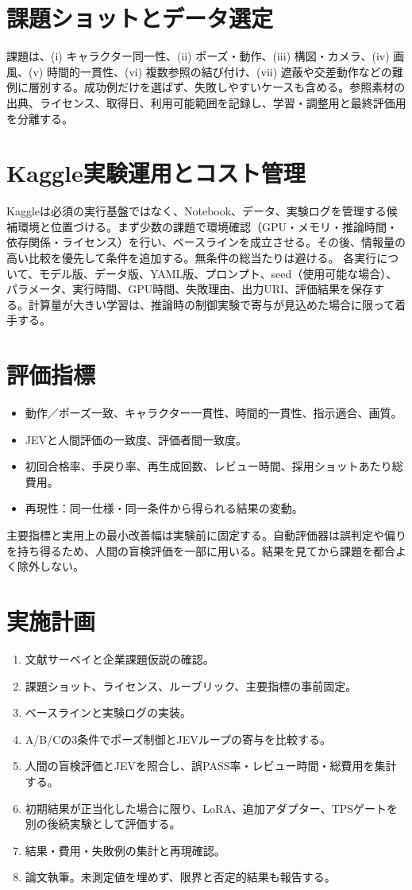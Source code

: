 \documentclass[11pt,a4paper]{article}
\begin{document}
\section{課題ショットとデータ選定}
課題は、(i) キャラクター同一性、(ii) ポーズ・動作、(iii) 構図・カメラ、(iv) 画風、(v) 時間的一貫性、(vi) 複数参照の結び付け、(vii) 遮蔽や交差動作などの難例に層別する。成功例だけを選ばず、失敗しやすいケースも含める。参照素材の出典、ライセンス、取得日、利用可能範囲を記録し、学習・調整用と最終評価用を分離する。

\section{Kaggle実験運用とコスト管理}
Kaggleは必須の実行基盤ではなく、Notebook、データ、実験ログを管理する候補環境と位置づける。まず少数の課題で環境確認（GPU・メモリ・推論時間・依存関係・ライセンス）を行い、ベースラインを成立させる。その後、情報量の高い比較を優先して条件を追加する。無条件の総当たりは避ける。
各実行について、モデル版、データ版、YAML版、プロンプト、seed（使用可能な場合）、パラメータ、実行時間、GPU時間、失敗理由、出力URI、評価結果を保存する。計算量が大きい学習は、推論時の制御実験で寄与が見込めた場合に限って着手する。

\section{評価指標}
\begin{itemize}[nosep]
\item 動作／ポーズ一致、キャラクター一貫性、時間的一貫性、指示適合、画質。
\item JEVと人間評価の一致度、評価者間一致度。
\item 初回合格率、手戻り率、再生成回数、レビュー時間、採用ショットあたり総費用。
\item 再現性：同一仕様・同一条件から得られる結果の変動。
\end{itemize}
主要指標と実用上の最小改善幅は実験前に固定する。自動評価器は誤判定や偏りを持ち得るため、人間の盲検評価を一部に用いる。結果を見てから課題を都合よく除外しない。

\section{実施計画}
\begin{enumerate}[nosep]
\item 文献サーベイと企業課題仮説の確認。
\item 課題ショット、ライセンス、ルーブリック、主要指標の事前固定。
\item ベースラインと実験ログの実装。
\item A/B/Cの3条件でポーズ制御とJEVループの寄与を比較する。
\item 人間の盲検評価とJEVを照合し、誤PASS率・レビュー時間・総費用を集計する。
\item 初期結果が正当化した場合に限り、LoRA、追加アダプター、TPSゲートを別の後続実験として評価する。
\item 結果・費用・失敗例の集計と再現確認。
\item 論文執筆。未測定値を埋めず、限界と否定的結果も報告する。
\end{enumerate}
\end{document}
